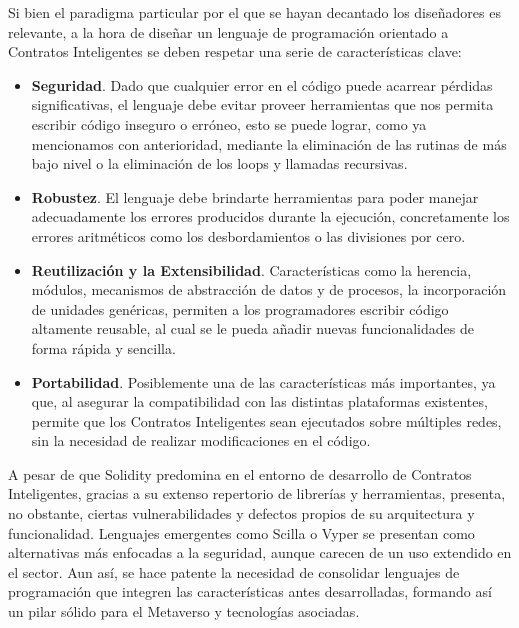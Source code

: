 \documentclass[a4paper,10pt]{article}
\begin{document}
	Si bien el paradigma particular por el que se hayan decantado los diseñadores es relevante, a la hora de diseñar un lenguaje de programación orientado a Contratos Inteligentes se deben respetar una serie de características clave:
	\begin{itemize}
		\item \textbf{Seguridad}. Dado que cualquier error en el código puede acarrear pérdidas significativas, el lenguaje debe evitar proveer herramientas que nos permita escribir código inseguro o erróneo, esto se puede lograr, como ya mencionamos con anterioridad, mediante la eliminación de las rutinas de más bajo nivel o la eliminación de los loops y llamadas recursivas.
		\item \textbf{Robustez}. El lenguaje debe brindarte herramientas para poder manejar adecuadamente los errores producidos durante la ejecución, concretamente los errores aritméticos como los desbordamientos o las divisiones por cero.
		\item \textbf{Reutilización y la Extensibilidad}. Características como la herencia, módulos, mecanismos de abstracción de datos y de procesos, la incorporación de unidades genéricas, permiten a los programadores escribir código altamente reusable, al cual se le pueda añadir nuevas funcionalidades de forma rápida y sencilla.
		\item \textbf{Portabilidad}. Posiblemente una de las características más importantes, ya que, al asegurar la compatibilidad con las distintas plataformas existentes, permite que los Contratos Inteligentes sean ejecutados sobre múltiples redes, sin la necesidad de realizar modificaciones en el código.
	\end{itemize}
	A pesar de que Solidity predomina en el entorno de desarrollo de Contratos Inteligentes, gracias a su extenso repertorio de librerías y herramientas, presenta, no obstante, ciertas vulnerabilidades y defectos propios de su arquitectura y funcionalidad. Lenguajes emergentes como Scilla o Vyper se presentan como alternativas más enfocadas a la seguridad, aunque carecen de un uso extendido en el sector. Aun así, se hace patente la necesidad de consolidar lenguajes de programación que integren las características antes desarrolladas, formando así un pilar sólido para el Metaverso y tecnologías asociadas.
\end{document}
